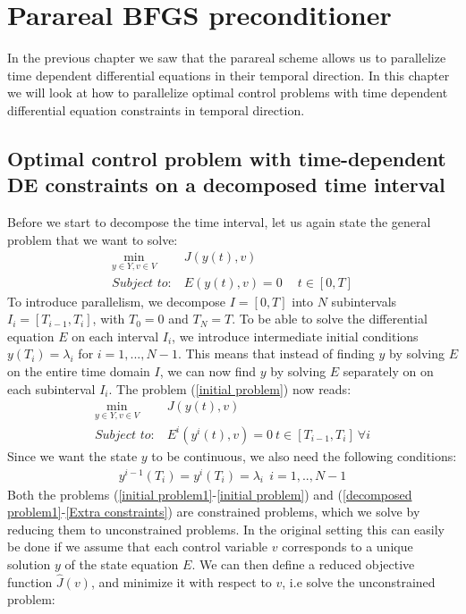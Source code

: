 \chapter{Parareal BFGS preconditioner}
In the previous chapter we saw that the parareal scheme allows us to parallelize time dependent differential equations in their temporal direction. In this chapter we will look at how to parallelize optimal control problems with time dependent differential equation constraints in temporal direction. 
\section{Optimal control problem with time-dependent DE constraints on a decomposed time interval}
Before we start to decompose the time interval, let us again state the general problem that we want to solve:
\begin{align}
\underset{y\in Y,v\in V}{\text{min}} \ &J(y(t),v) \label{initial problem1}\\
\textit{Subject to:} \ &E(y(t),v)=0 \ \quad t\in [0,T] \label{initial problem}
\end{align}
To introduce parallelism, we decompose $I=[0,T]$ into $N$ subintervals $I_i=[T_{i-1},T_i]$, with $T_0=0$ and $T_N=T$. To be able to solve the differential equation $E$ on each interval $I_i$, we introduce intermediate initial conditions $y(T_i)=\lambda_i$ for $i=1,...,N-1$. This means that instead of finding $y$ by solving $E$ on the entire time domain $I$, we can now find $y$ by solving $E$ separately on on each subinterval $I_i$. The problem (\ref{initial problem}) now reads:
\begin{align}
\underset{y\in Y,v\in V}{\text{min}} \ &J(y(t),v)  \label{decomposed problem1}\\
\textit{Subject to:} \ &E^i(y^i(t),v)=0 \ t\in [T_{i-1},T_i] \ \forall i \label{decomposed problem}
\end{align} 
Since we want the state $y$ to be continuous, we also need the following conditions:
\begin{align}
y^{i-1}(T_i)=y^i(T_i)=\lambda_i \ \ i=1,..,N-1 \label{Extra constraints}
\end{align} 
Both the problems (\ref{initial problem1}-\ref{initial problem}) and (\ref{decomposed problem1}-\ref{Extra constraints}) are constrained problems, which we solve by reducing them to unconstrained problems. In the original setting this can easily be done if we assume that each control variable $v$ corresponds to a unique solution $y$ of the state equation $E$. We can then define a reduced objective function $\hat{J}(v)$, and minimize it with respect to $v$, i.e solve the unconstrained problem:
